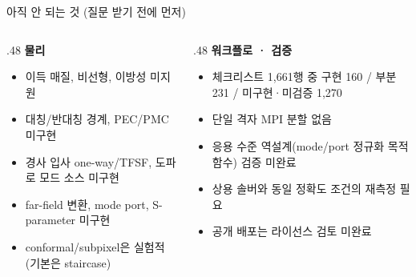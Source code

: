 \documentclass[aspectratio=169,11pt]{beamer}
\begin{document}
\begin{frame}{아직 안 되는 것 (질문 받기 전에 먼저)}
  \begin{columns}[T]
    \begin{column}{.48\textwidth}
      \textbf{물리}
      \begin{itemize}\footnotesize
        \item 이득 매질, 비선형, 이방성 미지원
        \item 대칭/반대칭 경계, PEC/PMC 미구현
        \item 경사 입사 one-way/TFSF, 도파로 모드 소스 미구현
        \item far-field 변환, mode port, S-parameter 미구현
        \item conformal/subpixel은 실험적 (기본은 staircase)
      \end{itemize}
    \end{column}
    \begin{column}{.48\textwidth}
      \textbf{워크플로 · 검증}
      \begin{itemize}\footnotesize
        \item 체크리스트 1,661행 중 구현 160 / 부분 231 / 미구현·미검증 1,270 \\ 
        \item 단일 격자 MPI 분할 없음
        \item 응용 수준 역설계(mode/port 정규화 목적함수) 검증 미완료
        \item 상용 솔버와 동일 정확도 조건의 재측정 필요
        \item 공개 배포는 라이선스 검토 미완료
      \end{itemize}
    \end{column}
  \end{columns}
  \vspace{2mm}
\end{frame}
\end{document}
